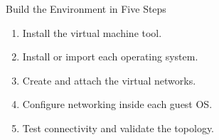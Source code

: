 \begin{frame}{Build the Environment in Five Steps}
  \begin{enumerate}
    \item Install the virtual machine tool.
    \item Install or import each operating system.
    \item Create and attach the virtual networks.
    \item Configure networking inside each guest OS.
    \item Test connectivity and validate the topology.
  \end{enumerate}
\end{frame}
